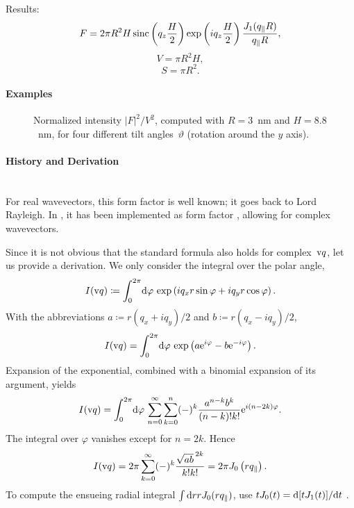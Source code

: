 Results:
\begin{equation*}
  F=  2\pi R^2 H  \operatorname{sinc}\left(q_ z \frac{H}{2}\right) \exp\left(i q_ z \frac{H}{2}\right)
    \frac{J_1(q_{\parallel} R )}{q_{\parallel} R },
\end{equation*}
\begin{equation*}
  V = \pi R^2 H,
\end{equation*}
\begin{equation*}
  S=\pi R^2.
\end{equation*}

\paragraph{Examples}\strut

\begin{figure}[H]
\begin{center}
\end{center}
\caption{Normalized intensity $|F|^2/V^2$,
computed with $R=3$~nm and $H=8.8$~nm,
for four different tilt angles~$\vartheta$ (rotation around the $y$ axis).}
\end{figure}

\paragraph{History and Derivation}\strut\\
For real wavevectors, this form factor is well known;
it goes back to Lord Rayleigh.
In \IsGISAXS, it has been implemented as form factor 
\cite[Eq.~2.27]{Laz06} \cite[Eq.~223]{ReLL09},
allowing for complex wavevectors.

Since it is not obvious that the standard formula also holds for complex~$\text{v}{q}$,
let us provide a derivation. We only consider the integral over the polar angle,
\begin{equation}
  I(\text{v}{q}) \coloneqq \int_0^{2\pi}\!\mathrm d\varphi\,\exp\left(iq_xr\sin\varphi+iq_yr\cos\varphi\right).
\end{equation}
With the abbreviations $a\coloneqq r(q_x+iq_y)/2$ and $b\coloneqq r(q_x-iq_y)/2$,
\begin{equation}
  I(\text{v}{q}) = \int_0^{2\pi}\!\mathrm d\varphi\,\exp\left(a\mathrm e^{i\varphi}-b\mathrm e^{-i\varphi}\right).
\end{equation}
Expansion of the exponential, combined with a binomial expansion of its argument, yields
\begin{equation}
  I(\text{v}{q})
  = \int_0^{2\pi}\!\mathrm d\varphi\,
  \sum_{n=0}^\infty\sum_{k=0}^n(-)^k\frac{a^{n-k}b^{k}}{(n-k)!k!}\mathrm e^{i(n-2k)\varphi}.
\end{equation}
The integral over $\varphi$ vanishes except for $n=2k$. Hence
\begin{equation}
  I(\text{v}{q})
  = 2\pi \sum_{k=0}^\infty(-)^k\frac{{\sqrt{ab}\,}^{2k}}{k!k!}
  = 2\pi J_0\left(rq_\parallel\right).
\end{equation}
To compute the ensueing radial integral $\int \mathrm d r r J_0(rq_\parallel)$,
use $t J_0(t)= \mathrm d[t J_1(t)]/\mathrm d t$ \cite[Formula~9.1.30a]{AbSt64}.


